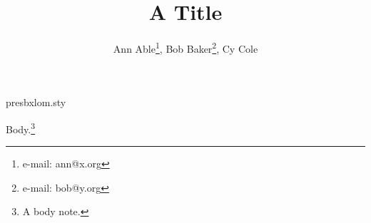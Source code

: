 \begin{filecontents*}[overwrite]{presbxlom.sty}
\def\@aabuffer{}
\def\author #1{\expandafter\def\expandafter\@aabuffer\expandafter{\@aabuffer \small\rm #1\relax \par}}
\def\address#1{\expandafter\def\expandafter\@aabuffer\expandafter{\@aabuffer \small\it #1\relax \par\vspace{0em}}}
\def\maketitle{
\begin{center}
   {\bf \@title \par}
   \vskip 1em
   \@aabuffer\relax
\end{center} \par
\gdef\@aabuffer{}
}
\def\thefootnote{\alph{footnote}}
\end{filecontents*}

\title{A Title}
\author{Ann Able\footnote{e-mail: ann@x.org}, Bob Baker\footnote{e-mail: bob@y.org}, Cy Cole}
\address{University of Somewhere}
\maketitle
Body.\footnote{A body note.}

